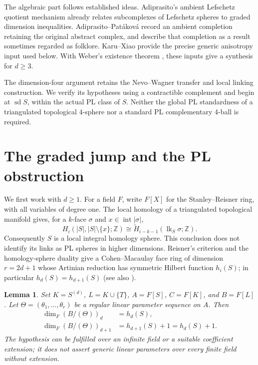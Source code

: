 \documentclass[11pt]{article}
\newtheorem{lemma}[theorem]{Lemma}
\theoremstyle{remark}
\newcommand{\Z}{\mathbb Z}
\newcommand{\lk}{\operatorname{lk}}
\newcommand{\sd}{\operatorname{sd}}
\newcommand{\interior}{\operatorname{int}}
\begin{document}
The algebraic part follows established ideas. Adiprasito's ambient
Lefschetz quotient mechanism \cite[Observation~4.3 and Corollary~4.8]{A}
already relates subcomplexes of Lefschetz spheres to graded dimension
inequalities. Adiprasito--Pat\'akov\'a \cite[Theorem~2]{AP} record an
ambient completion retaining the original abstract complex, and describe
that completion as a result sometimes regarded as folklore. Karu--Xiao
\cite[Theorems~1.2--1.3]{KX} provide the precise generic anisotropy input
used below. With Weber's existence theorem \cite[Theorem~1]{W}, these
inputs give a synthesis for $d\geq3$.

The dimension-four argument retains the Nevo--Wagner transfer and local
linking construction. We verify its hypotheses using a contractible
complement and begin at $\sd S$, within the actual PL class of $S$.
Neither the global PL standardness of a triangulated topological
4-sphere nor a standard PL complementary 4-ball is required.

\section{The graded jump and the PL obstruction}

We first work with $d\geq1$. For a field $F$, write $F[X]$ for the
Stanley--Reisner ring, with all variables of degree one. The local
homology of a triangulated topological manifold gives, for a $k$-face
$\sigma$ and $x\in\interior|\sigma|$,
\[
H_i(|S|,|S|\setminus\{x\};\Z)
 \cong\widetilde H_{i-k-1}(\lk_S\sigma;\Z).
\]
Consequently $S$ is a local integral homology sphere. This conclusion
does not identify its links as PL spheres in higher dimensions.
Reisner's criterion and the homology-sphere duality give a
Cohen--Macaulay face ring of dimension $r=2d+1$ whose Artinian reduction
has symmetric Hilbert function $h_i(S)$; in particular
$h_d(S)=h_{d+1}(S)$ (see also \cite[Sections~2.1 and 2.3]{KX}).

\begin{lemma}\label{lem:jump}
Set $K=S^{(d)}$, $L=K\cup\{T\}$, $A=F[S]$, $C=F[K]$, and $B=F[L]$.
Let $\Theta=(\theta_1,\ldots,\theta_r)$ be a regular linear parameter
sequence on $A$. Then
\begin{align}
\dim_F(B/(\Theta))_d&=h_d(S),\label{eq:degree-d}\\
\dim_F(B/(\Theta))_{d+1}&=h_{d+1}(S)+1=h_d(S)+1.\label{eq:jump}
\end{align}
The hypothesis can be fulfilled over an infinite field or a suitable
coefficient extension; it does not assert generic linear parameters over
every finite field without extension.
\end{lemma}
\end{document}
